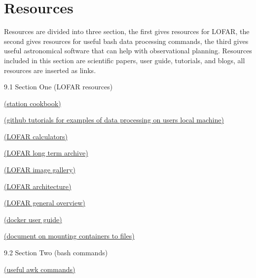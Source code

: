 \documentclass[11pt,fleqn]{book} %
\begin{document}
\vspace{7mm}


\section{Resources}

Resources are divided into three section, the first gives resources for LOFAR, the second gives resources for useful bash data processing commands, the third gives useful astronomical software that can help with observational planning. Resources included in this section are scientific papers, user guide, tutorials, and blogs, all resources are inserted as links.
%
\vspace{3mm}

9.1 Section One (LOFAR resources)

\vspace{3mm}

\href{https://lofar.ie/wp-content/uploads/2018/03/station_data_cookbook_v1.2.pdf}{(station cookbook)}


\href{https://github.com/murphp30/I_LOFAR_workshop_2020}{(github tutorials for examples of data processing on users local machine)}


\href{https://old.astron.nl/radio-observatory/lofar-tools/lofar-calculators/lofar-calculators}{(LOFAR calculators)}


\href{https://lta.lofar.eu/Lofar}{(LOFAR long term archive)}


\href{https://www.lofar-surveys.org/gallery_preview.html}{(LOFAR image gallery)}


\href{http://www.astro.rug.nl/~peletier/BDT_LOFAR-IEEE_main.pdf}{(LOFAR architecture)}


\href{https://arxiv.org/pdf/1305.3550.pdf}{(LOFAR general overview)}


\href{https://docker-curriculum.com/}{(docker user guide)}


\href{https://docs.docker.com/storage/bind-mounts/}{(document on mounting containers to files)}


\vspace{3mm}
9.2 Section Two (bash commands)

\vspace{3mm}

\href{https://likegeeks.com/awk-command/}{(useful awk commands)}
\end{document}
